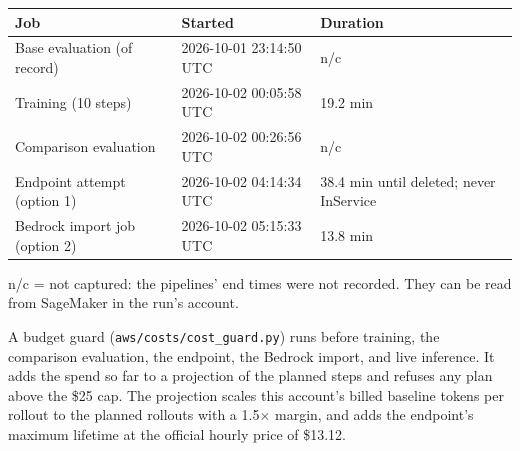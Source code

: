 \documentclass[11pt]{article}
\begin{document}
\begin{center}
\begin{minipage}{\linewidth}\centering
\begin{tabular}{P{5.2cm}P{4.2cm}P{5.6cm}}
\toprule
\textbf{Job} & \textbf{Started} & \textbf{Duration} \\
\midrule
Base evaluation (of record) & 2026-10-01 23:14:50 UTC & n/c \\
Training (10 steps) & 2026-10-02 00:05:58 UTC & 19.2 min \\
Comparison evaluation & 2026-10-02 00:26:56 UTC & n/c \\
Endpoint attempt (option 1) & 2026-10-02 04:14:34 UTC & 38.4 min until deleted; never InService \\
Bedrock import job (option 2) & 2026-10-02 05:15:33 UTC & 13.8 min \\
\bottomrule
\end{tabular}
\end{minipage}
\end{center}
{\small n/c = not captured: the pipelines' end times were not recorded. They can be read from SageMaker in the run's account.}\par
A budget guard (\texttt{aws/costs/cost\_guard.py}) runs before training, the comparison evaluation, the
endpoint, the Bedrock import, and live inference. It adds the spend so far to a projection of the planned
steps and refuses any plan above the \$25 cap. The projection scales this account's billed
baseline tokens per rollout to the planned rollouts with a 1.5$\times$ margin, and adds the endpoint's
maximum lifetime at the official hourly price of \$13.12.
\end{document}

